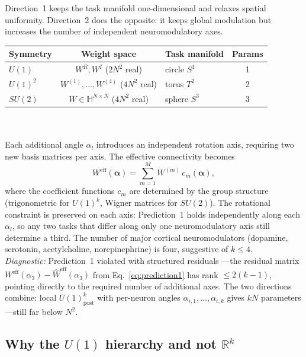 \documentclass[11pt,a4paper]{article}
\newcommand{\R}{\mathbb{R}}
\renewcommand{\H}{\mathbb{H}}
\newcommand{\Weff}{W^{\text{eff}}}
\begin{document}
{Direction~1 keeps the task manifold one-dimensional and relaxes 
spatial uniformity. Direction~2 does the opposite: it keeps global 
modulation but increases the number of independent neuromodulatory 
axes.

\begin{center}
\renewcommand{\arraystretch}{1.3}
\begin{tabular}{@{}lclc@{}}
\toprule
\textbf{Symmetry} & \textbf{Weight space} & 
\textbf{Task manifold} & \textbf{Params} \\
\midrule
$U(1)$ & $W^R, W^I$ ($2N^2$ real) & circle $S^1$ & 1 \\
$U(1)^2$ & $W^{(1)}, \ldots, W^{(4)}$ ($4N^2$ real) & 
torus $T^2$ & 2 \\
$SU(2)$ & $W \in \H^{N\times N}$ ($4N^2$ real) & 
sphere $S^3$ & 3 \\
\bottomrule
\end{tabular}
\end{center}
\\
\\
Each additional angle $\alpha_l$ introduces an independent rotation 
axis, requiring two new basis matrices per axis. The effective 
connectivity becomes
\begin{equation}
\Weff(\boldsymbol{\alpha}) = \sum_{m=1}^{M} W^{(m)}\, 
c_m(\boldsymbol{\alpha}),
\end{equation}
where the coefficient functions $c_m$ are determined by the group 
structure (trigonometric for $U(1)^k$, Wigner matrices for $SU(2)$). 
The rotational constraint is preserved on each axis: Prediction~1 
holds independently along each $\alpha_l$, so any two tasks that 
differ along only one neuromodulatory axis still determine a third. 
The number of major cortical neuromodulators (dopamine, serotonin, 
acetylcholine, norepinephrine) is four, suggestive of $k \leq 4$.
\\
\emph{Diagnostic:} Prediction~1 violated with structured residuals 
---the residual matrix $\Weff(\alpha_3) - 
\widehat{W}^{\text{eff}}(\alpha_3)$ from 
Eq.~\eqref{eq:prediction1} has rank $\leq 2(k-1)$, pointing 
directly to the required number of additional axes. The two directions combine: local $U(1)_{\text{post}}^k$ with 
per-neuron angles $\alpha_{i,1}, \ldots, \alpha_{i,k}$ gives $kN$ 
parameters---still far below $N^2$.


\subsection{Why the $U(1)$ hierarchy and not $\R^k$}
\label{sec:why_hierarchy}

}
\end{document}
